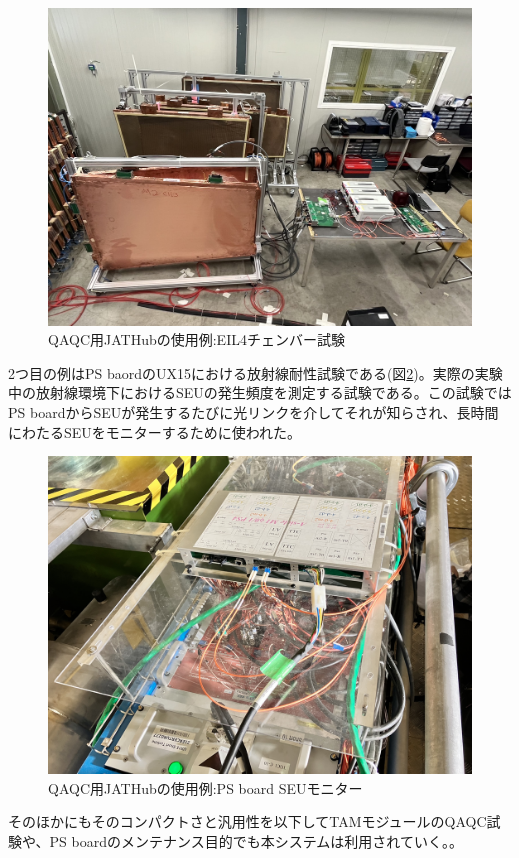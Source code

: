 \begin{figure} 
\centering
\includegraphics[width=16cm]{fig/QAQC/JATHubEIL4.JPG}
\caption[QAQC用JATHubの使用例:EIL4チェンバー試験]{QAQC用JATHubの使用例:EIL4チェンバー試験\cite{mt_wada}}
\label{JATHubEIL4}
\end{figure}

2つ目の例はPS baordのUX15における放射線耐性試験である(図\ref{JATHubSEU})。実際の実験中の放射線環境下におけるSEUの発生頻度を測定する試験である。この試験ではPS boardからSEUが発生するたびに光リンクを介してそれが知らされ、長時間にわたるSEUをモニターするために使われた。

\begin{figure} 
\centering
\includegraphics[width=16cm]{fig/QAQC/JATHubSEU.JPG}
\caption[QAQC用JATHubの使用例:PS board SEUモニター]{QAQC用JATHubの使用例:PS board SEUモニター\cite{mt_hashimoto}}
\label{JATHubSEU}
\end{figure}

そのほかにもそのコンパクトさと汎用性を以下してTAMモジュールのQAQC試験や、PS boardのメンテナンス目的でも本システムは利用されていく。。